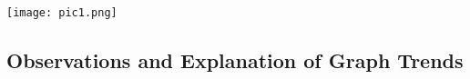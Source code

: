 \documentclass{article}
\begin{document}
    
    
    \begin{center}
            \texttt{[image: pic1.png]}
        \end{center}
        
    \subsection{Observations and Explanation of Graph Trends}    
    
\end{document}
